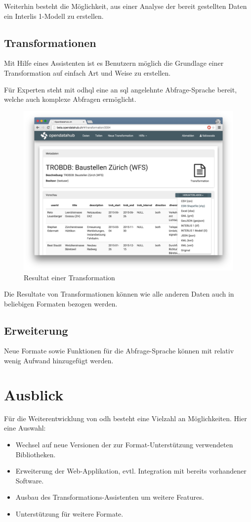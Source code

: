 Weiterhin besteht die Möglichkeit, aus einer Analyse der bereit gestellten Daten ein Interlis 1-Modell zu erstellen.

\subsection*{Transformationen}
Mit Hilfe eines Assistenten ist es Benutzern möglich die Grundlage einer Transformation auf einfach Art und Weise zu erstellen. 

Für Experten steht mit \gls{odhql} eine an \acs{sql} angelehnte Abfrage-Sprache bereit, welche auch komplexe Abfragen ermöglicht.

\begin{figure}[H]
    \centering
    \includegraphics[width=2\linewidth/3]{fig/transformation-detail}
    \caption*{Resultat einer Transformation}
\end{figure}

Die Resultate von Transformationen können wie alle anderen Daten auch in beliebigen Formaten bezogen werden.

\subsection*{Erweiterung}
Neue Formate sowie Funktionen für die Abfrage-Sprache können mit relativ wenig Aufwand hinzugefügt werden.

\section*{Ausblick}
Für die Weiterentwicklung von \acs{odh} besteht eine Vielzahl an Möglichkeiten. Hier eine Auswahl:
\begin{itemize}
\item Wechsel auf neue Versionen der zur Format-Unterstützung verwendeten Bibliotheken.
\item Erweiterung der Web-Applikation, evtl. Integration mit bereits vorhandener Software.
\item Ausbau des Transformations-Assistenten um weitere Features.
\item Unterstützung für weitere Formate.
\end{itemize}
